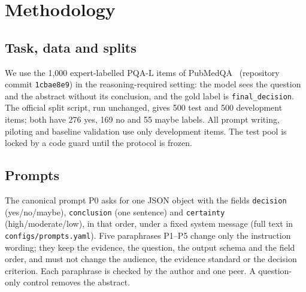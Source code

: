 \documentclass[conference]{IEEEtran}
\begin{document}
\section{Methodology}
\label{sec:method}
\subsection{Task, data and splits}
We use the 1{,}000 expert-labelled PQA-L items of
PubMedQA~\cite{jin2019pubmedqa} (repository commit \texttt{1cbae8e9}) in
the reasoning-required setting: the model sees the question and the
abstract without its conclusion, and the gold label is
\texttt{final\_decision}. The official split script, run unchanged, gives
500 test and 500 development items; both have 276 yes, 169 no and 55 maybe
labels. All prompt writing, piloting and baseline validation use only
development items. The test pool is locked by a code guard until the
protocol is frozen.

\subsection{Prompts}
The canonical prompt P0 asks for one JSON object with the fields
\texttt{decision} (yes/no/maybe), \texttt{conclusion} (one sentence) and
\texttt{certainty} (high/moderate/low), in that order, under a fixed system
message (full text in \texttt{configs/prompts.yaml}). Five paraphrases P1--P5 change only the instruction wording; they
keep the evidence, the question, the output schema and the field order,
and must not change the audience, the evidence standard or the decision
criterion. Each paraphrase is checked by the author and one peer. A question-only control removes the
abstract.
\end{document}

